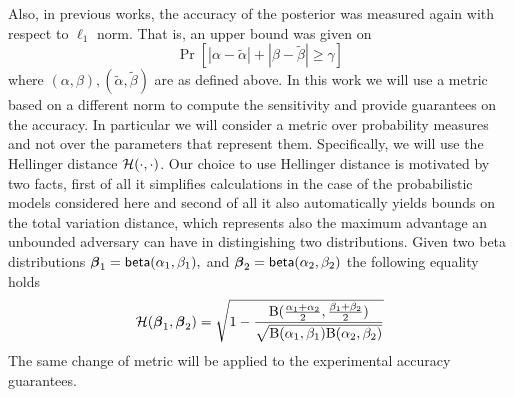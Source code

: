 \documentclass[sigconf]{acmart}
\begin{document}
\noindent Also, in previous works, the accuracy of the posterior was measured again with respect to $\ell_1$ norm. That is, an upper bound was given on
\[
  \Pr[|\alpha - \tilde\alpha| + |\beta - \tilde\beta |\geq \gamma ]
\]
where $(\alpha, \beta), (\tilde\alpha,\tilde\beta)$ are as  defined above.
In this work we will use a metric based on a different norm to compute the sensitivity
and provide guarantees on the accuracy. In particular we will consider a metric
over probability measures and not over the parameters that represent them.
Specifically, we will use the Hellinger distance $\mathcal{H}(\cdot,\cdot)$.
Our choice to use Hellinger distance is motivated by two facts, first of all it simplifies
calculations in the case of the probabilistic models considered here
and second of all it also automatically yields bounds on the total variation distance, which represents also the maximum advantage
an unbounded adversary can have in distingishing two distributions. 
Given two beta distributions
$\boldsymbol{\beta}_1=\mathsf{beta}(\alpha_1, \beta_1),$ and $\boldsymbol{\beta}_2=\mathsf{beta}(\alpha_2, \beta_2)$ the following equality holds 
\[
  \mathcal{H}(\boldsymbol{\beta}_1, \boldsymbol{\beta}_2)=
  \sqrt{1 - \frac{\textup{B}(\frac{\alpha_1 + \alpha_2}{2}, \frac{\beta_1 + \beta_2}{2})}{\sqrt{\textup{B}(\alpha_1,\beta_1)\textup{B}(\alpha_2,\beta_2)}}}
\]
The same change of metric will be applied to the experimental accuracy guarantees.
\end{document}
